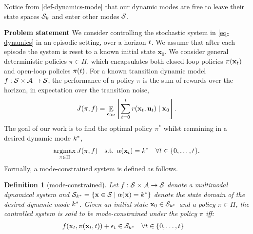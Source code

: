 \documentclass[twoside]{article}
\newtheorem{definition}{Definition}[section]
\DeclareMathOperator{\E}{\mathbb{E}}
\newcommand{\modeInd}{\ensuremath{k}}
\newcommand{\mode}[1]{\ensuremath{#1_{\modeInd}}}
\newcommand{\state}{\ensuremath{\mathbf{x}}}
\newcommand{\control}{\ensuremath{\mathbf{u}}}
\newcommand{\modeVar}{\ensuremath{\alpha}}
\DeclareMathOperator*{\argmax}{argmax}
\begin{document}
Notice from \cref{def-dynamics-mode} that our dynamic modes are free to leave
their state spaces \(\mode{\stateDomain}\) and enter other modes \(\mathcal{S}\).

\textbf{Problem statement}
We consider controlling the stochastic system in \cref{eq-dynamics} in an episodic setting, over a horizon \(\relax{\ensuremath{t}}\).
We assume that after each episode the system is reset to a known initial state \(\state_{0}\).
We consider general deterministic policies \(\pi \in \Pi\),
which encapsulates both closed-loop policies \(\pi(\state_{\timeInd})\) and open-loop policies \(\pi(t)\).
For a known transition dynamic model \(f: \mathcal{S} \times \mathcal{A} \rightarrow \mathcal{S}\),
the performance of a policy \(\pi\) is the sum of rewards over the horizon, in expectation over the transition noise,
\begin{align} \label{eq-objective}
J(\pi, \dynamicsFunc) = \E_{\bm\epsilon_{0:\TimeInd}} \left[ \sum_{\timeInd=0}^{\TimeInd} \rewardFunc(\state_{\timeInd}, \control_{\timeInd}) \mid \state_0 \right].
\end{align}
The goal of our work is to find the optimal policy \(\pi^{*}\) whilst remaining in a desired dynamic mode \(\desiredMode\),
\begin{align} \label{eq-main-problem}
\argmax_{\pi \in \Pi} J(\pi, \dynamicsFunc) \quad \text{s.t. } \modeVar(\state_{\timeInd}) = \desiredMode \quad \forall \timeInd \in \{0, \ldots, \TimeInd\}.
\end{align}
Formally, a mode-constrained system is defined as follows.
\begin{definition}[mode-constrained] \label{def-mode-remaining-main}
Let $f : \mathcal{S} \times \mathcal{A} \rightarrow \mathcal{S}$ denote a multimodal dynamical system
and $\desiredStateDomain = \{ \state \in \stateDomain \mid \modeVar(\state) = \desiredMode \}$
denote the state domain of the desired dynamic mode $\desiredMode$.
Given an initial state $\state_0 \in \desiredStateDomain$ and a policy $\pi \in \Pi$,
the controlled system is said to be mode-constrained under the policy $\pi$ iff:
\begin{align} \label{eq-mode-remaining-def-main}
\dynamicsFunc(\state_{\timeInd}, \policy(\state_{\timeInd}, \timeInd)) + \epsilon_{\timeInd} &\in \stateDomain_{\desiredMode} \quad \forall \timeInd \in \{0, \ldots, \TimeInd\}
\end{align}
\end{definition}
\end{document}

